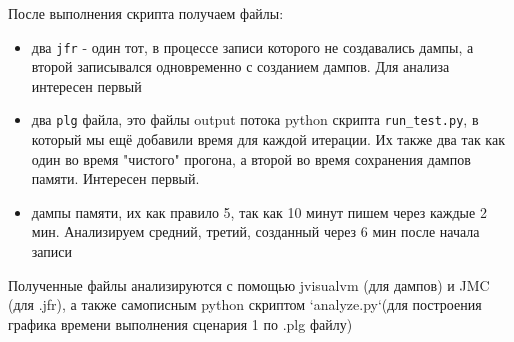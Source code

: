 \documentclass{article}
\begin{document}
	После выполнения скрипта получаем файлы:
		\begin{itemize}
			\item два \texttt{jfr} - один тот, в процессе записи которого не создавались дампы, а второй записывался одновременно с созданием дампов. Для анализа интересен первый
			\item два \texttt{plg} файла, это файлы output потока python скрипта \texttt{run\_test.py}, в который мы ещё добавили время для каждой итерации. Их также два так как один во время "чистого" прогона, а второй во время сохранения дампов памяти. Интересен первый. 
			\item дампы памяти, их как правило 5, так как 10 минут пишем через каждые 2 мин. Анализируем средний, третий, созданный через 6 мин после начала записи 
		\end{itemize}
	Полученные файлы анализируются с помощью jvisualvm (для дампов) и JMC (для .jfr), а также самописным python скриптом `analyze.py`(для построения графика времени выполнения сценария 1 по .plg файлу)
\end{document}
